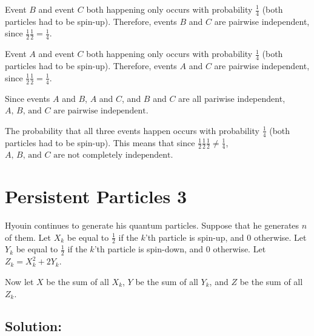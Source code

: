 \documentclass{article}
\begin{document}
Event $B$ and event $C$ both happening only occurs with probability $\frac{1}{4}$ (both particles had to be spin-up). Therefore, events $B$ and $C$ are pairwise independent, since $\frac{1}{2} \frac{1}{2} = \frac{1}{4}$.

Event $A$ and event $C$ both happening only occurs with probability $\frac{1}{4}$ (both particles had to be spin-up). Therefore, events $A$ and $C$ are pairwise independent, since $\frac{1}{2} \frac{1}{2} = \frac{1}{4}$.

Since events $A$ and $B$, $A$ and $C$, and $B$ and $C$ are all pariwise independent, $\boxed{\text{$A$, $B$, and $C$ are pairwise independent}}$.

The probability that all three events happen occurs with probability $\frac{1}{4}$ (both particles had to be spin-up). This means that since $\frac{1}{2} \frac{1}{2} \frac{1}{2} \neq \frac{1}{4}$, $\boxed{\text{$A$, $B$, and $C$ are not completely independent}}$.

\vspace{4cm}

\section{Persistent Particles 3}

Hyouin continues to generate his quantum particles. Suppose that he generates $n$ of them. Let $X_k$ be equal to $\frac{1}{2}$ if the $k$'th particle is spin-up, and $0$ otherwise. Let $Y_k$ be equal to $\frac{1}{2}$ if the $k$'th particle is spin-down, and $0$ otherwise. Let $Z_k = X_k^2 + 2Y_k$.

Now let $X$ be the sum of all $X_k$, $Y$ be the sum of all $Y_k$, and $Z$ be the sum of all $Z_k$.

\subsection{Solution:}
\end{document}

